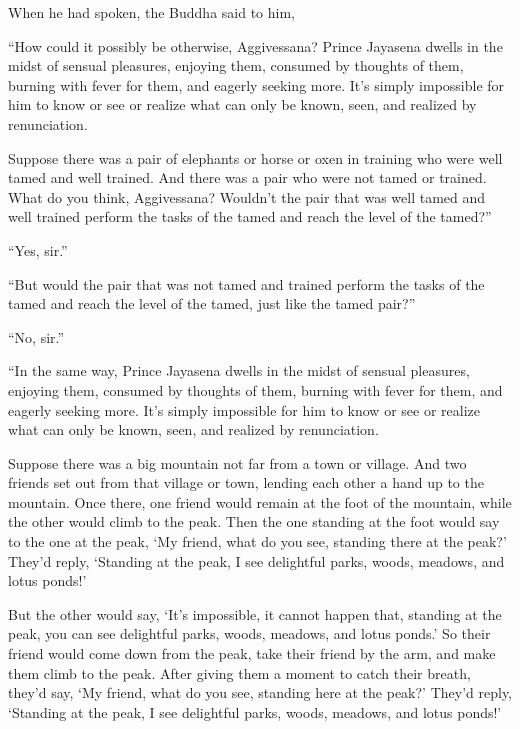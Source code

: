 \documentclass[12pt,openany]{book}%
\begin{document}
When he had spoken, the Buddha said to him, 

“How could it possibly be otherwise, Aggivessana? Prince Jayasena dwells in the midst of sensual pleasures, enjoying them, consumed by thoughts of them, burning with fever for them, and eagerly seeking more. It’s simply impossible for him to know or see or realize what can only be known, seen, and realized by renunciation. 

Suppose there was a pair of elephants or horse or oxen in training who were well tamed and well trained. And there was a pair who were not tamed or trained. What do you think, Aggivessana? Wouldn’t the pair that was well tamed and well trained perform the tasks of the tamed and reach the level of the tamed?” 

“Yes, sir.” 

“But would the pair that was not tamed and trained perform the tasks of the tamed and reach the level of the tamed, just like the tamed pair?” 

“No, sir.” 

“In the same way, Prince Jayasena dwells in the midst of sensual pleasures, enjoying them, consumed by thoughts of them, burning with fever for them, and eagerly seeking more. It’s simply impossible for him to know or see or realize what can only be known, seen, and realized by renunciation. 

Suppose there was a big mountain not far from a town or village. And two friends set out from that village or town, lending each other a hand up to the mountain. Once there, one friend would remain at the foot of the mountain, while the other would climb to the peak. Then the one standing at the foot would say to the one at the peak, ‘My friend, what do you see, standing there at the peak?’ They’d reply, ‘Standing at the peak, I see delightful parks, woods, meadows, and lotus ponds!’ 

But the other would say, ‘It’s impossible, it cannot happen that, standing at the peak, you can see delightful parks, woods, meadows, and lotus ponds.’ So their friend would come down from the peak, take their friend by the arm, and make them climb to the peak. After giving them a moment to catch their breath, they’d say, ‘My friend, what do you see, standing here at the peak?’ They’d reply, ‘Standing at the peak, I see delightful parks, woods, meadows, and lotus ponds!’ 
\end{document}
